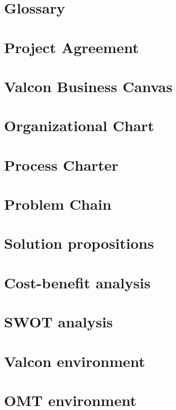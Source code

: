 \chapter{Glossary}

\chapter{Project Agreement}

\chapter{Valcon Business Canvas}

\chapter{Organizational Chart}

\chapter{Process Charter}

\chapter{Problem Chain}

\chapter{Solution propositions}

\chapter{Cost-benefit analysis}

\chapter{SWOT analysis}

\chapter{Valcon environment}

\chapter{OMT environment}
